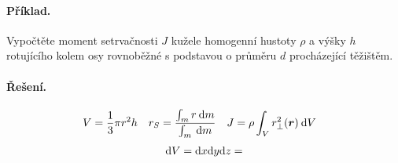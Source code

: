 \documentclass{article}
\begin{document}
		\paragraph*{Příklad.} Vypočtěte moment setrvačnosti $J$ kužele homogenní hustoty $\rho$ a výšky $h$ rotujícího kolem osy rovnoběžné s podstavou o průměru $d$ procházející těžištěm.
		
		\paragraph*{Řešení.}
		\begin{align*}
			V &= \frac 13 \pi r^2 h
		&
			r_S &= \frac{\int_m r \: {\mathrm d} m}{\int_m \: {\mathrm d} m}
		&
			J &= \rho \int_V r_\perp^2 (\boldsymbol r) \: {\mathrm d} V
		\end{align*}
		\begin{align*}
			{\mathrm d} V = {\mathrm d} x {\mathrm d} y {\mathrm d} z = 
		\end{align*}
	
	
\end{document}
